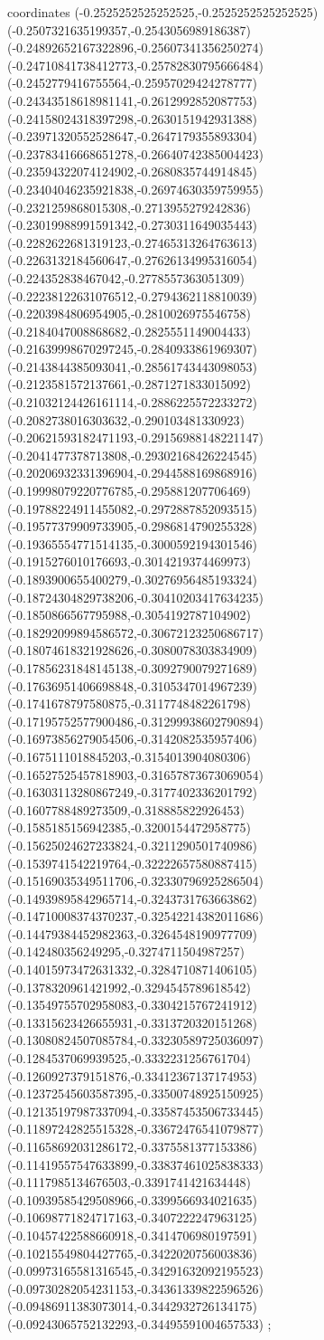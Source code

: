 coordinates {%
(-0.2525252525252525,-0.2525252525252525)
(-0.2507321635199357,-0.2543056989186387)
(-0.24892652167322896,-0.25607341356250274)
(-0.24710841738412773,-0.25782830795666484)
(-0.2452779416755564,-0.25957029424278777)
(-0.24343518618981141,-0.2612992852087753)
(-0.24158024318397298,-0.2630151942931388)
(-0.23971320552528647,-0.2647179355893304)
(-0.23783416668651278,-0.26640742385004423)
(-0.23594322074124902,-0.2680835744914845)
(-0.23404046235921838,-0.26974630359759955)
(-0.2321259868015308,-0.2713955279242836)
(-0.23019988991591342,-0.2730311649035443)
(-0.2282622681319123,-0.27465313264763613)
(-0.2263132184560647,-0.27626134995316054)
(-0.224352838467042,-0.2778557363051309)
(-0.22238122631076512,-0.2794362118810039)
(-0.2203984806954905,-0.2810026975546758)
(-0.2184047008868682,-0.2825551149004433)
(-0.21639998670297245,-0.2840933861969307)
(-0.2143844385093041,-0.28561743443098053)
(-0.2123581572137661,-0.2871271833015092)
(-0.21032124426161114,-0.2886225572233272)
(-0.2082738016303632,-0.290103481330923)
(-0.20621593182471193,-0.29156988148221147)
(-0.2041477378713808,-0.29302168426224545)
(-0.20206932331396904,-0.2944588169868916)
(-0.19998079220776785,-0.295881207706469)
(-0.19788224911455082,-0.2972887852093515)
(-0.19577379909733905,-0.2986814790255328)
(-0.19365554771514135,-0.3000592194301546)
(-0.1915276010176693,-0.3014219374469973)
(-0.1893900655400279,-0.30276956485193324)
(-0.18724304829738206,-0.30410203417634235)
(-0.1850866567795988,-0.3054192787104902)
(-0.18292099894586572,-0.30672123250686717)
(-0.18074618321928626,-0.3080078303834909)
(-0.17856231848145138,-0.3092790079271689)
(-0.17636951406698848,-0.3105347014967239)
(-0.1741678797580875,-0.3117748482261798)
(-0.17195752577900486,-0.31299938602790894)
(-0.16973856279054506,-0.3142082535957406)
(-0.1675111018845203,-0.3154013904080306)
(-0.16527525457818903,-0.31657873673069054)
(-0.16303113280867249,-0.3177402336201792)
(-0.1607788489273509,-0.318885822926453)
(-0.1585185156942385,-0.3200154472958775)
(-0.15625024627233824,-0.3211290501740986)
(-0.1539741542219764,-0.32222657580887415)
(-0.15169035349511706,-0.32330796925286504)
(-0.14939895842965714,-0.3243731763663862)
(-0.14710008374370237,-0.32542214382011686)
(-0.14479384452982363,-0.3264548190977709)
(-0.142480356249295,-0.3274711504987257)
(-0.14015973472631332,-0.3284710871406105)
(-0.1378320961421992,-0.3294545789618542)
(-0.13549755702958083,-0.3304215767241912)
(-0.13315623426655931,-0.3313720320151268)
(-0.13080824507085784,-0.33230589725036097)
(-0.1284537069939525,-0.3332231256761704)
(-0.1260927379151876,-0.33412367137174953)
(-0.12372545603587395,-0.33500748925150925)
(-0.12135197987337094,-0.33587453506733445)
(-0.11897242825515328,-0.33672476541079877)
(-0.11658692031286172,-0.3375581377153386)
(-0.11419557547633899,-0.33837461025838333)
(-0.1117985134676503,-0.3391741421634448)
(-0.10939585429508966,-0.3399566934021635)
(-0.10698771824717163,-0.3407222247963125)
(-0.10457422588660918,-0.3414706980197591)
(-0.10215549804427765,-0.3422020756003836)
(-0.09973165581316545,-0.34291632092195523)
(-0.09730282054231153,-0.34361339822596526)
(-0.09486911383073014,-0.3442932726134175)
(-0.09243065752132293,-0.34495591004657533)
};

